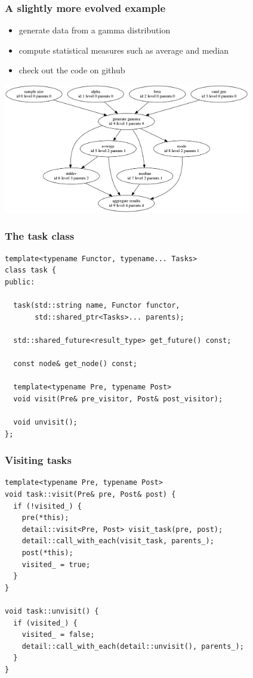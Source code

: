 \documentclass[11pt]{beamer}
\begin{document}
\begin{frame}[fragile]
\frametitle{A slightly more evolved example}

\begin{itemize}
\item generate data from a gamma distribution
\item compute statistical measures such as average and median
\item check out the code on github
\end{itemize}

\bigskip

\includegraphics[width=10.8cm]{img/statistical_key_facts.png}
\end{frame}


\begin{frame}[fragile]
\frametitle{The task class}

\begin{lstlisting}
template<typename Functor, typename... Tasks>
class task {
public:

  task(std::string name, Functor functor, 
       std::shared_ptr<Tasks>... parents);

  std::shared_future<result_type> get_future() const;

  const node& get_node() const;

  template<typename Pre, typename Post>
  void visit(Pre& pre_visitor, Post& post_visitor);

  void unvisit();
};
\end{lstlisting}

\end{frame}


\begin{frame}[fragile]
\frametitle{Visiting tasks}
\begin{lstlisting}
template<typename Pre, typename Post>
void task::visit(Pre& pre, Post& post) {
  if (!visited_) {
    pre(*this);
    detail::visit<Pre, Post> visit_task(pre, post);
    detail::call_with_each(visit_task, parents_);
    post(*this);
    visited_ = true;
  }
}

void task::unvisit() {
  if (visited_) {
    visited_ = false;
    detail::call_with_each(detail::unvisit(), parents_);
  }
}
\end{lstlisting}
\end{frame}
\end{document}
